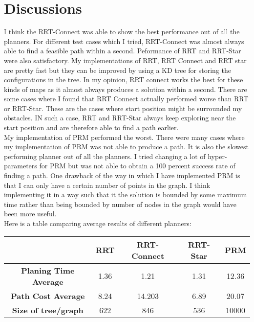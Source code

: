\documentclass[12pt]{article}
\begin{document}
\section{Discussions}
I think the RRT-Connect was able to show the best performance out of all the planners. For different test cases which I tried, RRT-Connect was almost always able to find a feasible path within a second. Peformance of RRT and RRT-Star were also satisfactory. My implementations of RRT, RRT Connect and RRT star are pretty fast but they can be improved by using a KD tree for storing the configurations in the tree. In my opinion, RRT connect works the best for these kinds of maps as it almost always produces a solution within a second. There are some cases where I found that RRT Connect actually performed worse than RRT or RRT-Star. These are the cases where start position might be surrounded my obstacles. IN such a case, RRT and RRT-Star always keep exploring near the start position and are therefore able to find a path earlier.\\
 My implementation of PRM performed the worst. There were many cases where my implementation of PRM was not able to produce a path. It is also the slowest performing planner out of all the planners. I tried changing a lot of hyper-parameters for PRM but was not able to obtain a 100 percent success rate of finding a path. One drawback of the way in which I have implemented PRM is that I can only have a certain number of points in the graph. I think implementing it in a way such that it the solution is bounded by some maximum time rather than being bounded by number of nodes in the graph would have been more useful. \\
 Here is a table comparing average results of different planners: \\
 \begin{table}[h]
\centering
\begin{tabular}{|c|c|c|c|c|}
\hline
 & \textbf{RRT} & \textbf{RRT-Connect} & \textbf{RRT-Star} & \textbf{PRM} \\
 \hline
 \textbf{Planing Time Average} & 1.36 & 1.21 & 1.31 & 12.36 \\
 \hline
 \textbf{Path Cost Average} & 8.24 & 14.203 & 6.89 & 20.07 \\
 \hline
 \textbf{Size of tree/graph} & 622 & 846 & 536 & 10000 \\
 \hline
\end{tabular}
\end{table}
\end{document}
